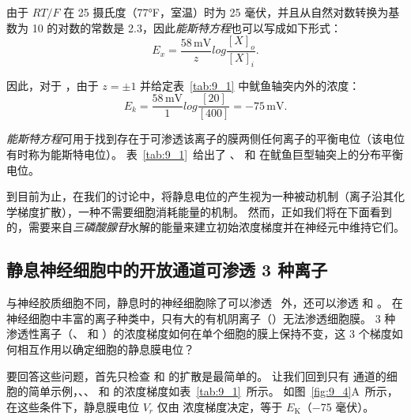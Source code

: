 由于 $RT/F$ 在 25 摄氏度（77°F，室温）时为 25 毫伏，并且从自然对数转换为基数为 10 的对数的常数是 2.3，因此\textit{能斯特方程}也可以写成如下形式：
\begin{equation}\label{eq:9_Nernst_Equation_58}
	E_x = \frac{58 \, \text{mV}}{z} 
			log \frac{[X]_o}{[X]_i}.
\end{equation}


因此，对于 ，由于 $ z = \pm 1 $ 并给定表~\ref{tab:9_1} 中鱿鱼轴突内外的浓度：
\begin{equation}\label{eq:9_axon_concentrations}
	E_k = \frac{58 \, \text{mV}}{1} 
			log \frac{[20]}{[400]}
			= -75 \, \text{mV}.
\end{equation}


\textit{能斯特方程}可用于找到存在于可渗透该离子的膜两侧任何离子的平衡电位（该电位有时称为能斯特电位）。
表~\ref{tab:9_1}~给出了 、 和  在鱿鱼巨型轴突上的分布平衡电位。


到目前为止，在我们的讨论中，将静息电位的产生视为一种被动机制（离子沿其化学梯度扩散），一种不需要细胞消耗能量的机制。
然而，正如我们将在下面看到的，需要来自\textit{三磷酸腺苷}水解的能量来建立初始浓度梯度并在神经元中维持它们。



\subsection{静息神经细胞中的开放通道可渗透 3 种离子}

与神经胶质细胞不同，静息时的神经细胞除了可以渗透~ 外，还可以渗透  和 。
在神经细胞中丰富的离子种类中，只有大的有机阴离子（）无法渗透细胞膜。
3 种渗透性离子（、 和 ）的浓度梯度如何在单个细胞的膜上保持不变，这 3 个梯度如何相互作用以确定细胞的静息膜电位？


要回答这些问题，首先只检查  和  的扩散是最简单的。
让我们回到只有  通道的细胞的简单示例，、、 和  的浓度梯度如表~\ref{tab:9_1}~所示。
如图~\ref{fig:9_4}A~所示，在这些条件下，静息膜电位 $V_r$ 仅由  浓度梯度决定，等于 $E_\text{K}$（−75 毫伏）。


